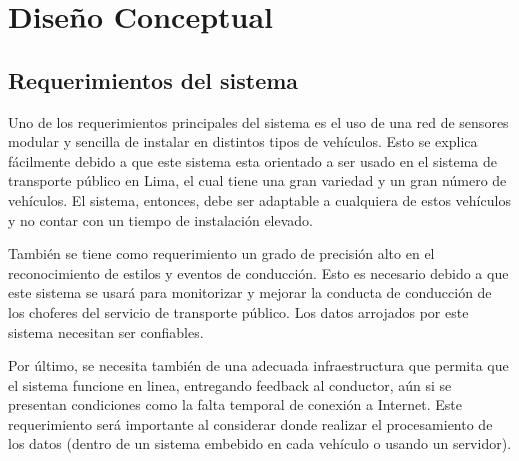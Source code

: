 \chapter{Diseño Conceptual}

\ifpdf
    \graphicspath{{Chapter3/Figs/Raster/}{Chapter3/Figs/PDF/}{Chapter3/Figs/}}
\else
    \graphicspath{{Chapter3/Figs/Vector/}{Chapter3/Figs/}}
\fi

\section{Requerimientos del sistema}
Uno de los requerimientos principales del sistema es el uso de una red de sensores modular y sencilla de instalar en distintos tipos de vehículos. Esto se explica fácilmente debido a que este sistema esta orientado a ser usado en el sistema de transporte público en Lima, el cual tiene una gran variedad y un gran número de vehículos. El sistema, entonces, debe ser adaptable a cualquiera de estos vehículos y no contar con un tiempo de instalación elevado.

También se tiene como requerimiento un grado de precisión alto en el reconocimiento de estilos y eventos de conducción. Esto es necesario debido a que este sistema se usará para monitorizar y mejorar la conducta de conducción de los choferes del servicio de transporte público. Los datos arrojados por este sistema necesitan ser confiables.

Por último, se necesita también de una adecuada infraestructura que permita que el sistema funcione en linea, entregando feedback al conductor, aún si se presentan condiciones como la falta temporal de conexión a Internet. Este requerimiento será importante al considerar donde realizar el procesamiento de los datos (dentro de un sistema embebido en cada vehículo o usando un servidor).

